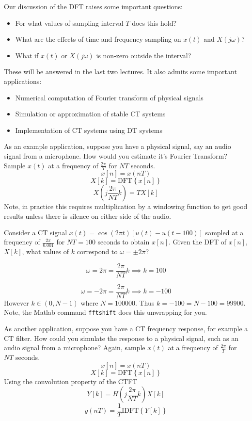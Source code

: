 Our discussion of the DFT raises some important questions:

\begin{itemize}
\item For what values of sampling interval $T$ does this hold?
\item What are the effects of time and frequency sampling on $x(t)$ and $X(j\omega)$?
\item What if $x(t)$ or $X(j\omega)$ is non-zero outside the interval?
\end{itemize}
These will be answered in the last two lectures. It also admits some important applications:
\begin{itemize}
\item Numerical computation of Fourier transform of physical signals
\item Simulation or approximation of stable CT systems
\item Implementation of CT systems using DT systems
\end{itemize}

As an example application, suppose you have a physical signal, say an audio signal from a microphone. How would you estimate it's Fourier Transform? Sample $x(t)$ at a frequency of $\frac{2\pi}{T}$ for $NT$ seconds.
\[
x[n] = x(nT)
\]
\[
X[k] = \text{DFT}\left\{ x[n] \right\}
\]
\[
X\left(j\frac{2\pi}{NT} k\right) = T X[k]
\]
Note, in practice this requires multiplication by a windowing function to get good results unless there is silence on either side of the audio.

\begin{example}
  Consider a CT signal $x(t) = \cos(2\pi t)\left[u(t) - u(t-100)\right]$ sampled at a frequency of $\frac{2\pi}{0.001}$ for $NT = 100$ seconds to obtain $x[n]$. Given the DFT of $x[n]$, $X[k]$, what values of $k$ correspond to $\omega = \pm 2\pi$?
  
  \[
  \omega = 2\pi = \frac{2\pi}{NT} k \implies k = 100
  \]
  
  \[
  \omega = - 2\pi = \frac{2\pi}{NT} k \implies k = -100
  \]
  However $k \in (0, N-1)$ where $N= 100000$. Thus $k = -100 = N - 100 = 99900$. Note, the Matlab command \texttt{fftshift} does this unwrapping for you.
\end{example}

As another application, suppose you have a CT frequency response, for example a CT filter. How could you simulate the response to a physical signal, such as an audio signal from a microphone? Again, sample $x(t)$ at a frequency of $\frac{2\pi}{T}$ for $NT$ seconds.
\[
x[n] = x(nT)
\]
\[
X[k] = \text{DFT}\left\{ x[n] \right\}
\]
Using the convolution property of the CTFT
\[
Y[k] = H\left(j\frac{2\pi}{NT} k\right) X[k]
\]
\[
y(nT) = \frac{1}{T} \text{IDFT}\left\{ Y[k] \right\}
\]

